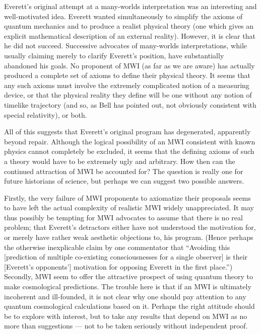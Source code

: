 \documentclass[aps,pra,12pt]{revtex4}
\begin{document}
Everett's original attempt at a many-worlds interpretation was an
interesting and well-motivated idea. 
Everett wanted simultaneously to simplify the axioms of quantum
mechanics and to produce a realist physical theory (one which 
gives an explicit mathematical description of an external reality). 
However, it is clear that he did not succeed. 
Successive advocates of many-worlds interpretations, while usually 
claiming merely to clarify Everett's position, have substantially abandoned 
his goals.  
No proponent of MWI (as far as we are aware)
has actually produced a complete set of axioms to
define their physical theory.  
It seems that any such axioms must involve the extremely complicated notion
of a measuring device, or that the physical reality they define will 
be one without any notion of timelike trajectory (and so, as 
Bell\cite{bell1,bell2} 
has pointed out, not obviously consistent with special relativity), or both. 

All of this suggests that Everett's original program has degenerated,  
apparently beyond repair.  
Although the logical possibility of an MWI consistent with known physics
cannot completely be excluded, it seems that the defining axioms
of such a theory would have to be extremely ugly and arbitrary.
How then can the continued attraction of MWI be accounted for?  
The question is really one for future historians of science,
but perhaps we can suggest two possible answers.

Firstly, the very failure of MWI proponents to axiomatize their
proposals seems to have left the actual complexity of realistic MWI widely
unappreciated.  
It may thus possibly be tempting for MWI advocates
to assume that there is no real problem;
that Everett's detractors
either have not understood the motivation for, or merely have rather
weak aesthetic objections to, his program.  (Hence perhaps the
otherwise inexplicable claim by one commentator that ``Avoiding this
[prediction of multiple co-existing consciousnesses for a single
observer] is their [Everett's opponents'] motivation for opposing
Everett in the first place.''\cite{deutsch})
Secondly, MWI seem to offer the attractive prospect of using quantum
theory to make cosmological predictions.  
The trouble here is that if an MWI is ultimately incoherent and ill-founded,
it is not clear why one should pay attention to
any quantum cosmological calculations based on it.
Perhaps the right attitude
should be to explore with interest, but to take any results that 
depend on MWI as no more than suggestions --- not to be taken seriously
without independent proof. 
\end{document}
